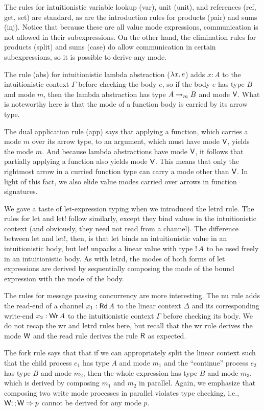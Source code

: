 The rules for intuitionistic variable lookup (var), unit (unit), and references
(ref, get, set) are standard, as are the introduction rules for products (pair)
and sums (inj). Notice that because these are all value mode expressions,
communication is not allowed in their subexpressions. On the other hand, the
elimination rules for products (split) and sums (case) do allow communication in
certain subexpressions, so it is possible to derive any mode.

The rule (abs) for intuitionistic lambda abstraction ($\lambda{x}.\,{e}$) adds $x:A$
to the intuitionistic context $\Gamma$ before checking the body $e$, so if the body
$e$ has type $B$ and mode $m$, then the lambda abstraction has type
${A}\rightarrow_{\footnotesize m}{B}$ and mode $\textsf{V}$. What is noteworthy here is that
the mode of a function body is carried by its arrow type.

The dual application rule (app) says that applying a function, which carries a
mode $m$ over its arrow type, to an argument, which must have mode $\textsf{V}$, yields
the mode $m$. And because lambda abstractions have mode $\textsf{V}$, it follows that
partially applying a function also yields mode $\textsf{V}$. This means that only the
rightmost arrow in a curried function type can carry a mode other than $\textsf{V}$. In
light of this fact, we also elide value modes carried over arrows in function
signatures.

We gave a taste of let-expression typing when we introduced the letrd rule. The
rules for let and let! follow similarly, except they bind values in the
intuitionistic context (and obviously, they need not read from a channel). The
difference between let and let!, then, is that let binds an intuitionistic value
in an intuitionistic body, but let! unpacks a linear value with type
${!}\,{A}$ to be used freely in an intuitionistic body. As with letrd, the
modes of both forms of let expressions are derived by sequentially composing the
mode of the bound expression with the mode of the body.

The rules for message passing concurrency are more interesting. The nu rule adds
the read-end of a channel $x_1: \text{\textsf{Rd}}\,A$ to the linear context $\Delta$ and its
corresponding write-end $x_2 : \text{\textsf{Wr}}\,A$ to the intuitionistic context $\Gamma$
before checking its body. We do not recap the wr and letrd rules here, but
recall that the wr rule derives the mode $\textsf{W}$ and the read rule derives the
rule $\textsf{R}$ as expected.

The fork rule says that that if we can appropriately split the linear context
such that the child process $e_1$ has type $A$ and mode $m_1$ and the
``continue'' process $e_2$ has type $B$ and mode $m_2$, then the whole
expression has type $B$ and mode $m_3$, which is derived by composing $m_1$ and
$m_2$ in parallel. Again, we emphasize that composing two write mode processes
in parallel violates type checking, i.e., $\textsf{W} ;; \textsf{W} => p$ cannot be derived
for any mode $p$.

